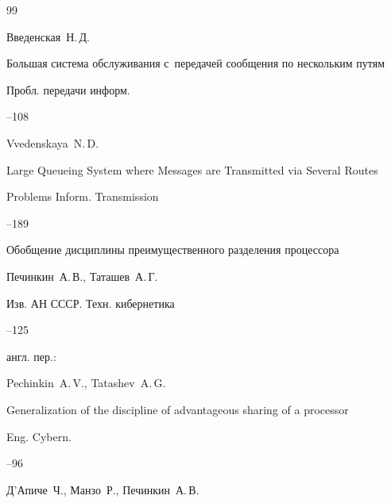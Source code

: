 \begin{thebibliography}{99}

\by    Введенская~Н.\,Д.

\paper Большая система обслуживания с~передачей сообщения по нескольким путям

\jour Пробл. передачи информ.




--108




\transl

\by Vvedenskaya~N.\,D.

\paper Large Queueing System where Messages are Transmitted via Several Routes

\jour Problems Inform. Transmission




--189




\paper Обобщение дисциплины преимущественного разделения процессора

\by    Печинкин~А.\,В., Таташев~А.\,Г.

\jour Изв. АН СССР. Техн. кибернетика



--125

\transl англ. пер.:~

\by Pechinkin~A.\,V., Tatashev~A.\,G.

\paper Generalization of the discipline of advantageous sharing of a processor

\jour Eng. Cybern. 



--96 









\by Д'Апиче~Ч., Манзо~Р., Печинкин~А.\,В.


\end{thebibliography}
